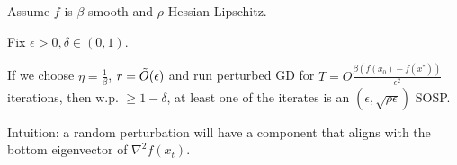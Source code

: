 \begin{theorem}
    Assume \(f\) is \(\beta\)-smooth and \(\rho\)-Hessian-Lipschitz. 

    Fix \(\epsilon > 0, \delta \in (0, 1)\). 

    If we choose \(\eta = \frac{1}{\beta}\), \(r = \Tilde{O}(\epsilon)\) and run perturbed GD for \(T = O\frac{\beta (f(x_0) - f(x^*))}{\epsilon^2}\) iterations, then w.p. \(\geq 1 - \delta\), at least one of the iterates is an \((\epsilon, \sqrt{\rho \epsilon})\) SOSP. 
\end{theorem}

Intuition: a random perturbation will have a component that aligns with the bottom eigenvector of \(\nabla^2 f(x_t)\). 